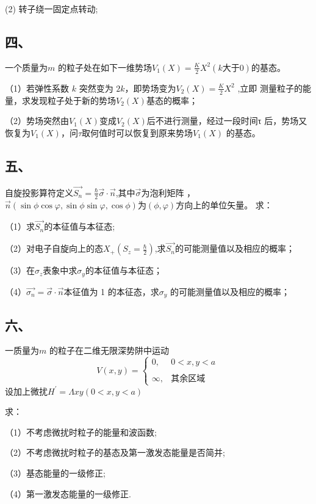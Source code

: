 (2) 转子绕一固定点转动;
\subsection{四、}
一个质量为$m$ 的粒子处在如下一维势场$V_1(X) = \frac{K}{2}X^2(k \text{大于} 0)$的基态。

（1）若弹性系数 $k$ 突然变为 $2k$，即势场变为$V_2(X) = \frac{K}{2}X^2$ ,立即
测量粒子的能量，求发现粒子处于新的势场$V_2(X)$基态的概率；

（2）势场突然由$V_1(X)$变成$V_2(X)$后不进行测量，经过一段时间τ
后，势场又恢复为$V_1(X)$，问$\tau$取何值时可以恢复到原来势场$V_1(X)$
的基态。
\subsection{五、}
自旋投影算符定义$\vec{S_n}=\frac{\hbar}{2}\vec{\sigma}\cdot \vec{n}$,其中$\vec{\sigma}$为泡利矩阵 ，$\vec{n}(\sin\phi\cos\varphi,\sin\phi\sin\varphi,\cos\phi)$为$(\phi,\varphi)$方向上的单位矢量。
求：

（1）求$\vec{S_n}$的本征值与本征态;

（2）对电子自旋向上的态$X_+(S_z=\frac{\hbar}{2})$,求$\vec{S_n}$的可能测量值以及相应的概率；

（3）在$\sigma_z$表象中求$\sigma_y$的本征值与本征态；

（4）$\vec{\sigma_n}=\vec{\sigma}\cdot\vec{n}$本征值为 1 的本征态，求$\sigma_y$ 的可能测量值以及相应的概率；
\subsection{六、}
一质量为$m$ 的粒子在二维无限深势阱中运动
$$V(x,y)=\begin{cases}
0,&0 < x, y < a\\\\
\infty ,& \text{其余区域}
\end{cases}~
$$
设加上微扰$H^\prime=\Lambda xy(0 < x, y < a)$

求：

（1）不考虑微扰时粒子的能量和波函数;

（2）不考虑微扰时粒子的基态及第一激发态能量是否简并;

（3）基态能量的一级修正;

（4）第一激发态能量的一级修正.